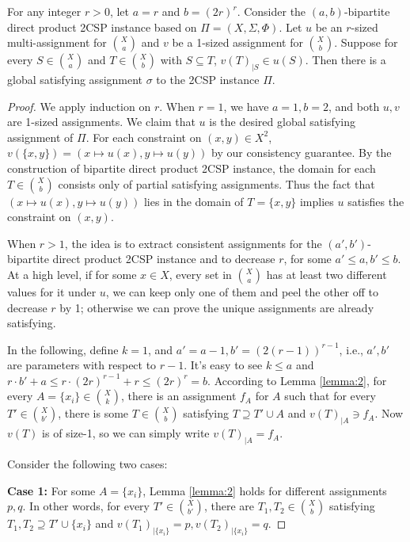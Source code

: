 \begin{lemma}\label{lemma:3}
   For any integer $r > 0$, let $a=r$ and $b=(2r)^r$. Consider the $(a,b)$-bipartite direct product 2CSP instance based on $\Pi=(X,\Sigma,\Phi)$. Let $u$ be an $r$-sized multi-assignment for $\binom{X}{a}$ and $v$ be a 1-sized assignment for $\binom{X}{b}$. Suppose for every $S \in \binom{X}{a}$ and $T \in \binom{X}{b}$ with $S \subseteq T$, $v(T)_{|S} \in u(S)$. Then there is a global satisfying assignment $\sigma$ to the 2CSP instance $\Pi$.
\end{lemma}

\begin{proof}

We apply induction on $r$. When $r=1$, we have $a=1,b=2$, and both $u,v$ are 1-sized assignments. We claim that $u$ is the desired global satisfying assignment of $\Pi$. For each constraint on $(x,y) \in X^2$, $v(\{x,y\})=(x \mapsto u(x), y \mapsto u(y))$ by our consistency guarantee. By the construction of bipartite direct product 2CSP instance, the domain for each $T \in \binom{X}{b}$ consists only of partial satisfying assignments. Thus the fact that $(x \mapsto u(x),y \mapsto u(y))$ lies in the domain of $T=\{x,y\}$ implies $u$ satisfies the constraint on $(x,y)$.

When $r>1$, the idea is to extract consistent assignments for the $(a',b')$-bipartite direct product 2CSP instance and to decrease $r$, for some $a'\le a, b' \le b$. At a high level, if for some $x \in X$, every set in $\binom{X}{a}$ has at least two different values for it under $u$, we can keep only one of them and peel the other off to decrease $r$ by 1; otherwise we can prove the unique assignments are already satisfying.

In the following, define $k=1$, and $a'=a-1,b'=(2(r-1))^{r-1}$, i.e., $a',b'$ are parameters with respect to $r-1$. It's easy to see $k \le a$ and $r\cdot b'+a \le r\cdot (2r)^{r-1}+r \le (2r)^{r}=b$. According to Lemma \ref{lemma:2}, for every $A=\{x_i\}\in \binom{X}{k}$, there is an assignment $f_A$ for $A$ such that for every $T' \in \binom{X}{b'}$, there is some $T\in \binom{X}{b}$ satisfying $T \supseteq T' \cup A$ and $v(T)_{|A}\ni f_A$. Now $v(T)$ is of size-1, so we can simply write $v(T)_{|A}=f_A$.

Consider the following two cases:

\medskip\noindent
\textbf{Case 1:} For some $A=\{x_i\}$, Lemma \ref{lemma:2} holds for different assignments $p,q$. In other words, for every $T' \in \binom{X}{b'}$, there are $T_1,T_2 \in \binom{X}{b}$ satisfying $T_1,T_2 \supseteq T' \cup \{x_i\}$ and $v(T_1)_{|\{x_i\}}=p,v(T_2)_{|\{x_i\}}=q$. 
    

\end{proof}
